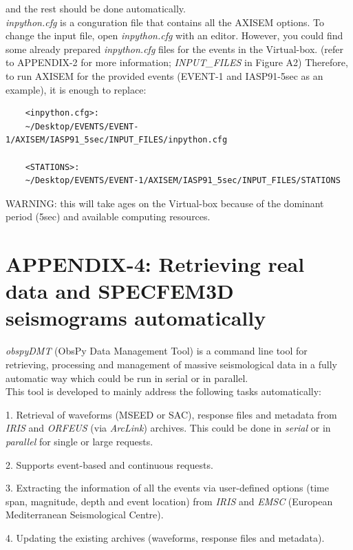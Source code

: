 \documentclass{article}
\begin{document}
and the rest should be done automatically. \\
\textit{inpython.cfg} is a conguration file that
contains all the AXISEM options. To change the input file, open \textit{inpython.cfg} with
an editor. However, you could find some already prepared \textit{inpython.cfg} files for
the events in the Virtual-box. (refer to APPENDIX-2 for more information; \textit{INPUT\_FILES} in Figure A2)
Therefore, to run AXISEM for the provided events (EVENT-1
and IASP91-5sec as an example), it is enough to replace:

\begin{verbatim}
    <inpython.cfg>:
    ~/Desktop/EVENTS/EVENT-1/AXISEM/IASP91_5sec/INPUT_FILES/inpython.cfg

    <STATIONS>:
    ~/Desktop/EVENTS/EVENT-1/AXISEM/IASP91_5sec/INPUT_FILES/STATIONS
\end{verbatim}

WARNING: this will take ages on the Virtual-box because of the dominant period (5sec) and available computing resources.

\newpage
\section{APPENDIX-4: Retrieving real data and SPECFEM3D seismograms automatically}

{\color{color18} \emph{obspyDMT}} (ObsPy Data Management Tool) is a command line
tool for retrieving, processing and management of massive seismological data in
a fully automatic way which could be run in serial or in parallel. \\

This tool is developed to mainly address the following tasks automatically:

1. Retrieval of waveforms (MSEED or SAC), response files and metadata from {\color{color18} \emph{IRIS}}
and {\color{color18} \emph{ORFEUS}} (via {\color{color18} \emph{ArcLink}}) archives.
This could be done in \textit{serial} or in \textit{parallel} for single or large
requests.

2. Supports event-based and continuous requests.

3. Extracting the information of all the events via user-defined options (time
span, magnitude, depth and event location) from {\color{color18} \emph{IRIS}} and
{\color{color18} \emph{EMSC}} (European Mediterranean Seismological Centre).

4. Updating the existing archives (waveforms, response files and metadata).
\end{document}
